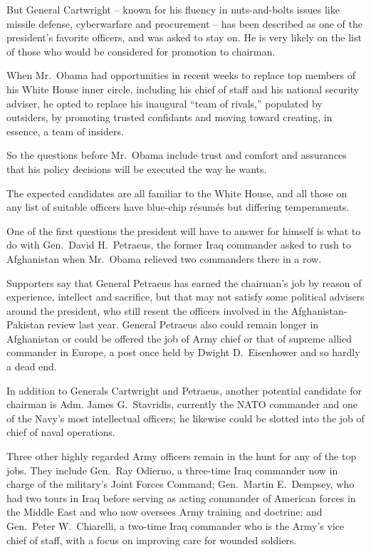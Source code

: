 ﻿\documentclass[12pt]{article}
\begin{document}
But General Cartwright -- known for his fluency in nuts-and-bolts issues like missile defense,
cyberwarfare and procurement -- has been described as one of the president's favorite officers, and
was asked to stay on. He is very likely on the list of those who would be considered for promotion
to chairman.

When Mr.~Obama had opportunities in recent weeks to replace top members of his White House inner
circle, including his chief of staff and his national security adviser, he opted to replace his
inaugural ``team of rivals,'' populated by outsiders, by promoting trusted confidants and moving
toward creating, in essence, a team of insiders.

So the questions before Mr.~Obama include trust and comfort and assurances that his policy decisions
will be executed the way he wants.

The expected candidates are all familiar to the White House, and all those on any list of suitable
officers have blue-chip r\'esum\'es but differing temperaments.

One of the first questions the president will have to answer for himself is what to do with
Gen.~David H.~Petraeus, the former Iraq commander asked to rush to Afghanistan when Mr.~Obama
relieved two commanders there in a row.

Supporters say that General Petraeus has earned the chairman's job by reason of experience,
intellect and sacrifice, but that may not satisfy some political advisers around the president, who
still resent the officers involved in the Afghanistan-Pakistan review last year. General Petraeus
also could remain longer in Afghanistan or could be offered the job of Army chief or that of supreme
allied commander in Europe, a post once held by Dwight D.~Eisenhower and so hardly a dead end.

In addition to Generals Cartwright and Petraeus, another potential candidate for chairman is Adm.
James G.~Stavridis, currently the NATO commander and one of the Navy's most intellectual officers;
he likewise could be slotted into the job of chief of naval operations.

Three other highly regarded Army officers remain in the hunt for any of the top jobs. They include
Gen.~Ray Odierno, a three-time Iraq commander now in charge of the military's Joint Forces Command;
Gen.~Martin E.~Dempsey, who had two tours in Iraq before serving as acting commander of American
forces in the Middle East and who now oversees Army training and doctrine; and Gen.~Peter
W.~Chiarelli, a two-time Iraq commander who is the Army's vice chief of staff, with a focus on
improving care for wounded soldiers.
\end{document}
